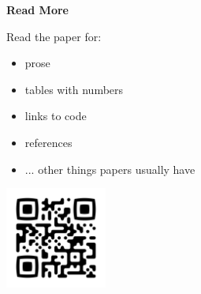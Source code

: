 \documentclass{article}
\newcommand{\sectionfont}{\fontsize{34}{34}\selectfont\setlength{\parskip}{1\baselineskip}}
\newcommand{\nfont}{\fontsize{21}{22}\selectfont\setlength{\parskip}{1\baselineskip}}
\begin{document}
\begin{minipage}[t]{0.286\textwidth}
		\sectionfont
		\vspace{\parskip}
		\textbf{Read More}
		\nfont
		
		Read the paper for:
		\begin{itemize}[noitemsep,topsep=-\baselineskip]
			\item prose
			\item tables with numbers
			\item links to code
			\item references
			\item ... other things papers usually have
		\end{itemize}
		
		\vspace{\parskip}\vspace{\parskip}\vspace{\parskip}\vspace{\parskip}
		\centering\includegraphics[width=0.25\textwidth]{qr.png}
	\end{minipage}%
\end{document}
